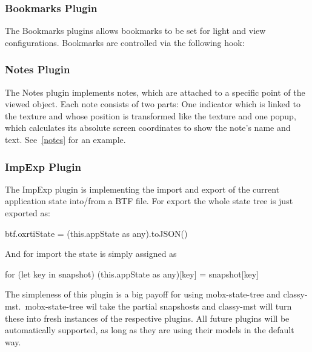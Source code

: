 \subsubsection{Bookmarks Plugin}
The Bookmarks plugins allows bookmarks to be set for light and view
configurations. Bookmarks are controlled via the following hook:

\subsubsection{Notes Plugin}
The Notes plugin implements notes, which are attached to a specific point of the
viewed object. Each note consists of two parts: One indicator which is linked
to the texture and whose position is transformed like the texture and one popup,
which calculates its absolute screen coordinates to show the note's name and
text. See~\autoref{notes} for an example.

\subsubsection{ImpExp Plugin }
The ImpExp plugin is implementing the import and export of the current
application state into/from a BTF file. For export the whole state tree is just
exported as:
\begin{typescript}
btf.oxrtiState = (this.appState as any).toJSON()
\end{typescript}
And for import the state is simply assigned as
\begin{typescript}
for (let key in snapshot)
   (this.appState as any)[key] = snapshot[key]
\end{typescript}
The simpleness of this plugin is a big payoff for using mobx-state-tree and
classy-mst.\ mobx-state-tree wil take the partial snapshosts and classy-mst will
turn these into fresh instances of the respective plugins. All future plugins will be automatically supported, as long as they
are using their models in the default way.

